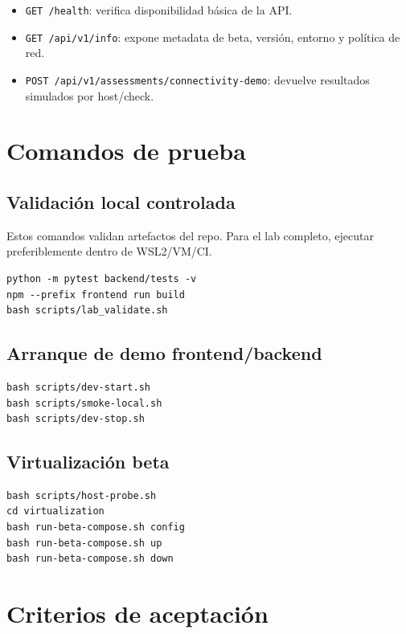 \documentclass[11pt,letterpaper]{article}
\begin{document}
\begin{itemize}
  \item \texttt{GET /health}: verifica disponibilidad básica de la API.
  \item \texttt{GET /api/v1/info}: expone metadata de beta, versión, entorno y política de red.
  \item \texttt{POST /api/v1/assessments/connectivity-demo}: devuelve resultados simulados por host/check.
\end{itemize}

\section{Comandos de prueba}

\subsection{Validación local controlada}

Estos comandos validan artefactos del repo. Para el lab completo, ejecutar preferiblemente dentro de WSL2/VM/CI.

\begin{verbatim}
python -m pytest backend/tests -v
npm --prefix frontend run build
bash scripts/lab_validate.sh
\end{verbatim}

\subsection{Arranque de demo frontend/backend}

\begin{verbatim}
bash scripts/dev-start.sh
bash scripts/smoke-local.sh
bash scripts/dev-stop.sh
\end{verbatim}

\subsection{Virtualización beta}

\begin{verbatim}
bash scripts/host-probe.sh
cd virtualization
bash run-beta-compose.sh config
bash run-beta-compose.sh up
bash run-beta-compose.sh down
\end{verbatim}

\section{Criterios de aceptación}
\end{document}
